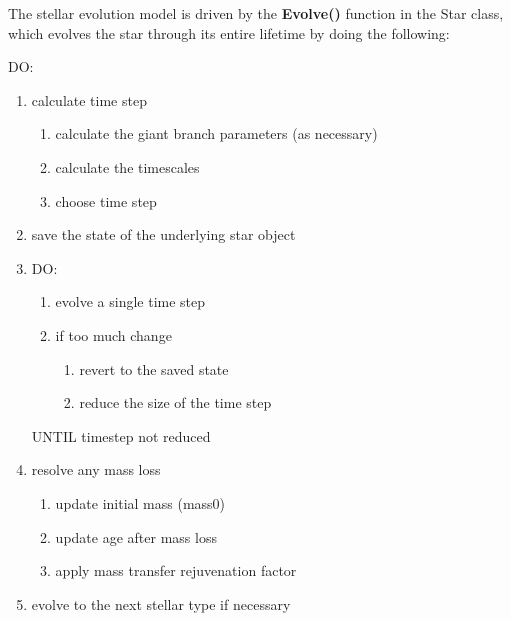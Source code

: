 \newpage
The stellar evolution model is driven by the \textbf{Evolve()} function in the Star class, which evolves the star through its entire lifetime by doing the following:

\tabto{2em}DO:

\hfill
\begin{minipage}{\dimexpr\textwidth-4em}
    \begin{enumerate}
        \item {
            calculate time step
            \begin{enumerate}
                \item {calculate the giant branch parameters (as necessary)}
                \item {calculate the timescales}
                \item {choose time step}
            \end{enumerate}
        }
 
        \item {save the state of the underlying star object}

        \item {
            DO:

            \hfill
            \begin{minipage}{\dimexpr\textwidth-4em}
                \begin{enumerate}
                    \item {evolve a single time step}
                
                    \item {
                        if too much change
                        \begin{enumerate}
                        \item{revert to the saved state}
                        \item{reduce the size of the time step}
                        \end{enumerate}
                    }
                \end{enumerate}
            \end{minipage}

            UNTIL timestep not reduced
        }
  
        \item {
            resolve any mass loss
            \begin{enumerate}
                \item {update initial mass (mass0)}
                \item {update age after mass loss}
                \item {apply mass transfer rejuvenation factor}
            \end{enumerate}
        }
 
        \item { evolve to the next stellar type if necessary }

    \end{enumerate}
\end{minipage}


